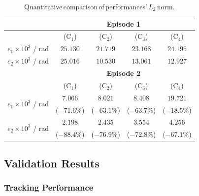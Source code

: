 \documentclass[journal]{IEEEtran}
\begin{document}

\begin{table}[!t]
    \renewcommand{\arraystretch}{1.3}
    \caption{Quantitative\,comparison\,of\,performances'\,$L_2$\,norm.}
    \centering
    \begin{tabular}{c c c c c}
    \hline
		& \multicolumn{4}{c}{\textbf{Episode 1}} \\
    \hline
	\hline 
		& (C$_1$) & (C$_2$) & (C$_3$) & (C$_4$) \\
	\hline
		$e_1\times10^{3}$ / rad & $25.130$ & $21.719$ & $23.168$ & $24.195$ \\ 
	\hline
        $e_2\times10^{3}$ / rad & $25.016$ & $10.530$ & $13.061$ & $12.927$ \\
	\hline
        & \multicolumn{4}{c}{\textbf{Episode 2}} \\
    \hline
    \hline
        & (C$_1$) & (C$_2$) & (C$_3$) & (C$_4$) \\
	\hline
    \multirow{2}{*}{$e_1\times10^{3}$ / rad} 
        & $7.066$ & $8.021$ & $8.408$ & $19.721$ \\
        & ($-71.6\%$) & ($-63.1\%$) & ($-63.7\%$) & ($-18.5\%$) \\
    \hline
    \multirow{2}{*}{$e_2\times10^{3}$ / rad} 
        & $2.198$ & $2.435$ & $3.554$ & $4.256$ \\
        & ($-88.4\%$) & ($-76.9\%$) & ($-72.8\%$) & ($-67.1\%$) \\
    \hline
    \end{tabular}
    \label{tab:sim:L2}
\end{table}

\subsection{Validation Results}

\subsubsection{Tracking Performance}
\end{document}
